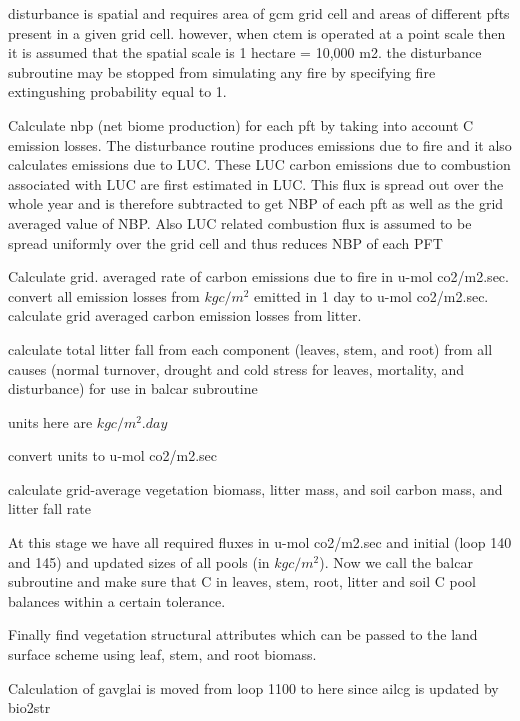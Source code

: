 disturbance is spatial and requires area of gcm grid cell and areas of different pfts present in a given grid cell. however, when ctem is operated at a point scale then it is assumed that the spatial scale is 1 hectare = 10,000 m2. the disturbance subroutine may be stopped from simulating any fire by specifying fire extingushing probability equal to 1.

Calculate nbp (net biome production) for each pft by taking into account C emission losses. The disturbance routine produces emissions due to fire and it also calculates emissions due to L\+U\+C. These L\+U\+C carbon emissions due to combustion associated with L\+U\+C are first estimated in L\+U\+C. This flux is spread out over the whole year and is therefore subtracted to get N\+B\+P of each pft as well as the grid averaged value of N\+B\+P. Also L\+U\+C related combustion flux is assumed to be spread uniformly over the grid cell and thus reduces N\+B\+P of each P\+F\+T

Calculate grid. averaged rate of carbon emissions due to fire in u-\/mol co2/m2.\+sec. convert all emission losses from $kg c/m^2$ emitted in 1 day to u-\/mol co2/m2.\+sec. calculate grid averaged carbon emission losses from litter.

calculate total litter fall from each component (leaves, stem, and root) from all causes (normal turnover, drought and cold stress for leaves, mortality, and disturbance) for use in balcar subroutine

units here are $kg c/m^2 .day$

convert units to u-\/mol co2/m2.\+sec

calculate grid-\/average vegetation biomass, litter mass, and soil carbon mass, and litter fall rate

At this stage we have all required fluxes in u-\/mol co2/m2.\+sec and initial (loop 140 and 145) and updated sizes of all pools (in $kg c/m^2$). Now we call the balcar subroutine and make sure that C in leaves, stem, root, litter and soil C pool balances within a certain tolerance.

Finally find vegetation structural attributes which can be passed to the land surface scheme using leaf, stem, and root biomass.

Calculation of gavglai is moved from loop 1100 to here since ailcg is updated by bio2str